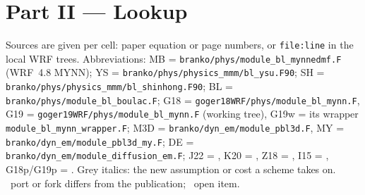 \landscapeopen
\section*{Part II --- Lookup}
{\small Sources are given per cell: paper equation or page numbers, or \texttt{file:line} in the
local WRF trees. Abbreviations: MB = \texttt{branko/phys/}\allowbreak\texttt{module\_bl\_mynnedmf.F} (WRF~4.8 MYNN);
YS = \texttt{branko/phys/}\allowbreak\texttt{physics\_mmm/}\allowbreak\texttt{bl\_ysu.F90}; SH = \texttt{branko/phys/}\allowbreak\texttt{physics\_mmm/}\allowbreak\texttt{bl\_shinhong.F90};
BL = \texttt{branko/phys/}\allowbreak\texttt{module\_bl\_boulac.F}; G18 = \texttt{goger18WRF/phys/}\allowbreak\texttt{module\_bl\_mynn.F},
G19 = \texttt{goger19WRF/phys/}\allowbreak\texttt{module\_bl\_mynn.F} (working tree), G19w = its wrapper
\texttt{module\_bl\_mynn\_}\allowbreak\texttt{wrapper.F}; M3D = \texttt{branko/dyn\_em/}\allowbreak\texttt{module\_pbl3d.F},
MY = \texttt{branko/dyn\_em/}\allowbreak\texttt{module\_pbl3d\_my.F}; DE = \texttt{branko/dyn\_em/}\allowbreak\texttt{module\_diffusion\_em.F};
J22 = \textcite{juliano2022}, K20 = \textcite{kosovic2020}, Z18 = \textcite{zhang2018},
I15 = \textcite{ito2015}, G18p/G19p = \textcite{goger2018,goger2019}. Grey italics: the new
assumption or cost a scheme takes on. \fork\ port or fork differs from the publication;
\open\ open item.\par}

